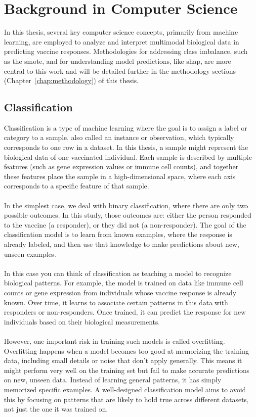 \documentclass[12pt,a4paper]{report}
\begin{document}
\pagebreak
\section{Background in Computer Science}
\noindent
In this thesis, several key computer science concepts, primarily from machine learning, are employed to analyze and interpret multimodal biological data in predicting vaccine responses. Methodologies for addressing class imbalance, such as the \acrfull{smote}, and for understanding model predictions, like \acrfull{shap}, are more central to this work and will be detailed further in the methodology sections (Chapter~\ref{chap:methodology}) of this thesis.

\subsection{Classification}
Classification is a type of machine learning where the goal is to assign a label or category to a sample, also called an instance or observation, which typically corresponds to one row in a dataset. In this thesis, a sample might represent the biological data of one vaccinated individual. Each sample is described by multiple features (such as gene expression values or immune cell counts), and together these features place the sample in a high-dimensional space, where each axis corresponds to a specific feature of that sample.\\
\\
In the simplest case, we deal with binary classification, where there are only two possible outcomes. In this study, those outcomes are: either the person responded to the vaccine (a responder), or they did not (a non-responder). The goal of the classification model is to learn from known examples, where the response is already labeled, and then use that knowledge to make predictions about new, unseen examples.\\
\\
In this case you can think of classification as teaching a model to recognize biological patterns. For example, the model is trained on data like immune cell counts or gene expression from individuals whose vaccine response is already known. Over time, it learns to associate certain patterns in this data with responders or non-responders. Once trained, it can predict the response for new individuals based on their biological measurements.\\
\\
However, one important risk in training such models is called overfitting. Overfitting happens when a model becomes too good at memorizing the training data, including small details or noise that don’t apply generally. This means it might perform very well on the training set but fail to make accurate predictions on new, unseen data. Instead of learning general patterns, it has simply memorized specific examples. A well-designed classification model aims to avoid this by focusing on patterns that are likely to hold true across different datasets, not just the one it was trained on.
\end{document}
